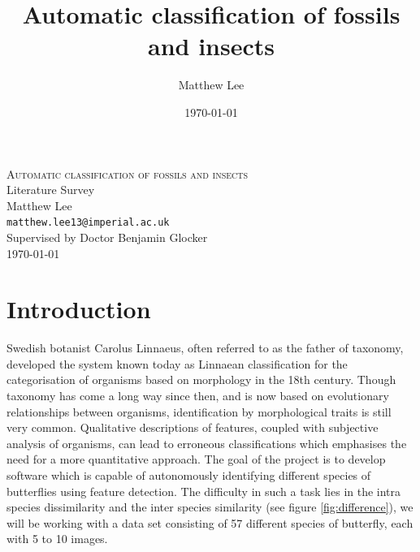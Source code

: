 \documentclass[11pt, titlepage, oneside]{article}
\title{Automatic classification of fossils and insects}
\author{Matthew Lee}
\date{\today}
\theoremstyle{plain}
\theoremstyle{definition}
\theoremstyle{remark}
\begin{document}

\begin{minipage}[b]{\linewidth}
	\center
	\textsc{\Large Automatic classification of fossils and insects}\\
	\vspace{1.0cm}
	\Large Literature Survey \\
	\vspace{1.0cm}
	\normalsize Matthew Lee\\
	\normalsize \texttt{matthew.lee13@imperial.ac.uk}\\
	\normalsize Supervised by Doctor Benjamin Glocker\\
	\vspace{0.35cm}
\today
\end{minipage}

\hspace{0.375cm}

\tableofcontents

\newpage
\section{Introduction}
	Swedish botanist Carolus Linnaeus, often referred to as the father of taxonomy, developed the system known today as Linnaean classification for the categorisation of organisms  based on morphology in the 18th century. Though taxonomy has come a long way since then, and is now based on evolutionary relationships between organisms, identification by morphological traits is still very common. Qualitative descriptions of features, coupled with subjective analysis of organisms, can lead to erroneous classifications\cite[p.~154]{nature} which emphasises the need for a more quantitative approach. The goal of the project is to develop software which is capable of autonomously identifying different species of butterflies using feature detection. The difficulty in such a task lies in the intra species dissimilarity and the inter species similarity (see figure \ref{fig:difference}), we will be working with a data set consisting of 57 different species of butterfly, each with 5 to 10 images. \\
\end{document}
